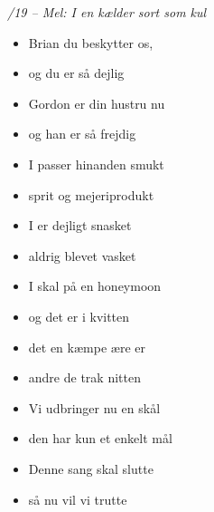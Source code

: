 \begin{center}
	\textit{/19 -- Mel: I en kælder sort som kul}
	\parbox[t]{.5\textwidth}{%
	\begin{itemize}
		\setlength{\itemsep}{-5pt}
		\item[1.] Brian du beskytter os,
		\item[] og du er så dejlig
		\item[] Gordon er din hustru nu
		\item[] og han er så frejdig
		\item[] I passer hinanden smukt
		\item[] sprit og mejeriprodukt
		\item[] I er dejligt snasket
		\item[] aldrig blevet vasket
	\end{itemize}
}%
	\parbox[t]{.5\textwidth}{%
		\begin{itemize}
			\setlength{\itemsep}{-5pt}
			\item[2.] I skal på en honeymoon
			\item[] og det er i kvitten
			\item[] det en kæmpe ære er
			\item[] andre de trak nitten
			\item[] Vi udbringer nu en skål
			\item[] den har kun et enkelt mål
			\item[] Denne sang skal slutte
			\item[] så nu vil vi trutte
		\end{itemize}
	}%
\end{center}

